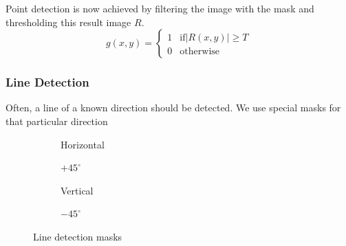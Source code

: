 Point detection is now achieved by filtering the image with the mask and thresholding this result image $R$.
\[
	g(x,y) =
	\begin{cases}
		1 & \text{if} |R(x,y)| \geq T \\
		0 & \text{otherwise}
	\end{cases}
\]

\subsubsection{Line Detection}
Often, a line of a known direction should be detected. We use special masks for that particular direction
\begin{figure}[h]
	\centering
	\begin{subfigure}[b]{0.2\textwidth}
		\centering
		\caption{Horizontal}
	\end{subfigure}
	\begin{subfigure}[b]{0.2\textwidth}
		\centering
		\caption{$+45^\circ$}
	\end{subfigure}
	\begin{subfigure}[b]{0.2\textwidth}
		\centering
		\caption{Vertical}
	\end{subfigure}
	\begin{subfigure}[b]{0.2\textwidth}
		\centering
		\caption{$-45^\circ$}
	\end{subfigure}
	\caption{Line detection masks}
\end{figure}


